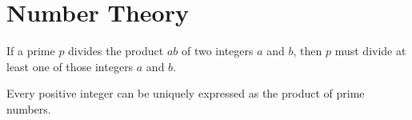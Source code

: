 \section{Number Theory}

\begin{lemma}
If a prime $p$ divides the product $ab$ of two integers $a$ and $b$,
then $p$ must divide at least one of those integers $a$ and $b$.
\end{lemma}

\begin{theorem}
Every positive integer can be uniquely expressed as the product of prime numbers.
\end{theorem}
